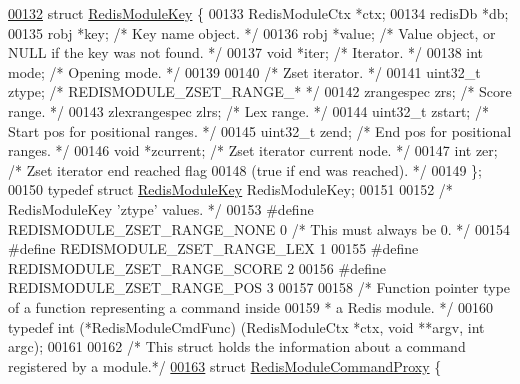\begin{DoxyCode}
\hyperlink{structRedisModuleKey}{00132} \textcolor{keyword}{struct} \hyperlink{structRedisModuleKey}{RedisModuleKey} \{
00133     RedisModuleCtx *ctx;
00134     redisDb *db;
00135     robj *key;      \textcolor{comment}{/* Key name object. */}
00136     robj *value;    \textcolor{comment}{/* Value object, or NULL if the key was not found. */}
00137     \textcolor{keywordtype}{void} *iter;     \textcolor{comment}{/* Iterator. */}
00138     \textcolor{keywordtype}{int} mode;       \textcolor{comment}{/* Opening mode. */}
00139 
00140     \textcolor{comment}{/* Zset iterator. */}
00141     uint32\_t ztype;         \textcolor{comment}{/* REDISMODULE\_ZSET\_RANGE\_* */}
00142     zrangespec zrs;         \textcolor{comment}{/* Score range. */}
00143     zlexrangespec zlrs;     \textcolor{comment}{/* Lex range. */}
00144     uint32\_t zstart;        \textcolor{comment}{/* Start pos for positional ranges. */}
00145     uint32\_t zend;          \textcolor{comment}{/* End pos for positional ranges. */}
00146     \textcolor{keywordtype}{void} *zcurrent;         \textcolor{comment}{/* Zset iterator current node. */}
00147     \textcolor{keywordtype}{int} zer;                \textcolor{comment}{/* Zset iterator end reached flag}
00148 \textcolor{comment}{                               (true if end was reached). */}
00149 \};
00150 \textcolor{keyword}{typedef} \textcolor{keyword}{struct} \hyperlink{structRedisModuleKey}{RedisModuleKey} RedisModuleKey;
00151 
00152 \textcolor{comment}{/* RedisModuleKey 'ztype' values. */}
00153 \textcolor{preprocessor}{#}\textcolor{preprocessor}{define} \textcolor{preprocessor}{REDISMODULE\_ZSET\_RANGE\_NONE} 0       \textcolor{comment}{/* This must always be 0. */}
00154 \textcolor{preprocessor}{#}\textcolor{preprocessor}{define} \textcolor{preprocessor}{REDISMODULE\_ZSET\_RANGE\_LEX} 1
00155 \textcolor{preprocessor}{#}\textcolor{preprocessor}{define} \textcolor{preprocessor}{REDISMODULE\_ZSET\_RANGE\_SCORE} 2
00156 \textcolor{preprocessor}{#}\textcolor{preprocessor}{define} \textcolor{preprocessor}{REDISMODULE\_ZSET\_RANGE\_POS} 3
00157 
00158 \textcolor{comment}{/* Function pointer type of a function representing a command inside}
00159 \textcolor{comment}{ * a Redis module. */}
00160 \textcolor{keyword}{typedef} \textcolor{keywordtype}{int} (*RedisModuleCmdFunc) (RedisModuleCtx *ctx, \textcolor{keywordtype}{void} **argv, \textcolor{keywordtype}{int} argc);
00161 
00162 \textcolor{comment}{/* This struct holds the information about a command registered by a module.*/}
\hyperlink{structRedisModuleCommandProxy}{00163} \textcolor{keyword}{struct} \hyperlink{structRedisModuleCommandProxy}{RedisModuleCommandProxy} \{

\end{DoxyCode}
